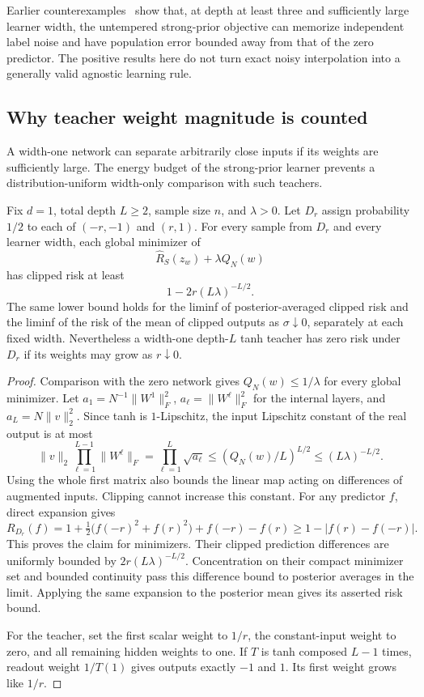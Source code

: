 Earlier counterexamples~\cite{opus} show that, at depth at least three and sufficiently large learner width, the untempered strong-prior objective can memorize independent label noise and have population error bounded away from that of the zero predictor. The positive results here do not turn exact noisy interpolation into a generally valid agnostic learning rule.

\subsection{Why teacher weight magnitude is counted}
A width-one network can separate arbitrarily close inputs if its weights are sufficiently large. The energy budget of the strong-prior learner prevents a distribution-uniform width-only comparison with such teachers.

\begin{proposition}
\label{prop:nearby-inputs}
Fix $d=1$, total depth $L\ge2$, sample size $n$, and $\lambda>0$. Let $D_r$ assign probability $1/2$ to each of $(-r,-1)$ and $(r,1)$. For every sample from $D_r$ and every learner width, each global minimizer of
\[
 \widehat R_S(z_w)+\lambda Q_N(w)
\]
has clipped risk at least
\[
 1-2r(L\lambda)^{-L/2}.
\]
The same lower bound holds for the liminf of posterior-averaged clipped risk and the liminf of the risk of the mean of clipped outputs as $\sigma\downarrow0$, separately at each fixed width. Nevertheless a width-one depth-$L$ tanh teacher has zero risk under $D_r$ if its weights may grow as $r\downarrow0$.
\end{proposition}
\begin{proof}
Comparison with the zero network gives $Q_N(w)\le1/\lambda$ for every global minimizer. Let $a_1=N^{-1}\|W^1\|_F^2$, $a_\ell=\|W^\ell\|_F^2$ for the internal layers, and $a_L=N\|v\|_2^2$. Since tanh is $1$-Lipschitz, the input Lipschitz constant of the real output is at most
\[
 \|v\|_2\prod_{\ell=1}^{L-1}\|W^\ell\|_F
 =\prod_{\ell=1}^L\sqrt{a_\ell}
 \le (Q_N(w)/L)^{L/2}
 \le (L\lambda)^{-L/2}.
\]
Using the whole first matrix also bounds the linear map acting on differences of augmented inputs. Clipping cannot increase this constant. For any predictor $f$, direct expansion gives
\[
 R_{D_r}(f)=1+\tfrac12\bigl(f(-r)^2+f(r)^2\bigr)+f(-r)-f(r)
 \ge1-|f(r)-f(-r)|.
\]
This proves the claim for minimizers. Their clipped prediction differences are uniformly bounded by $2r(L\lambda)^{-L/2}$. Concentration on their compact minimizer set and bounded continuity pass this difference bound to posterior averages in the limit. Applying the same expansion to the posterior mean gives its asserted risk bound.

For the teacher, set the first scalar weight to $1/r$, the constant-input weight to zero, and all remaining hidden weights to one. If $T$ is tanh composed $L-1$ times, readout weight $1/T(1)$ gives outputs exactly $-1$ and $1$. Its first weight grows like $1/r$.
\end{proof}

